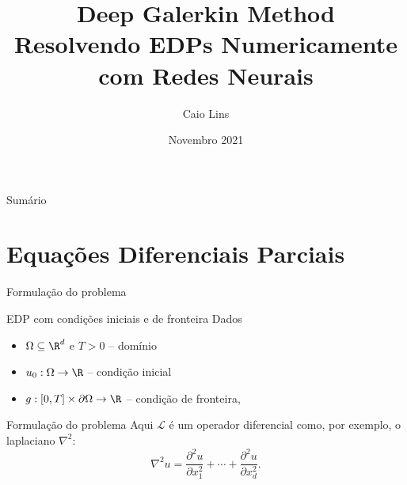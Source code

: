 \documentclass[13pt]{beamer}
\title[Deep Galerkin Method]{Deep Galerkin Method \\ {\normalsize Resolvendo EDPs Numericamente com Redes Neurais}}
\author[C. Lins]{Caio Lins}
\institute[EMAp]{FGV - EMAp}
\date[EMAp 2021]{Novembro 2021}
\begin{document}
\maketitle

\begin{frame}{Sumário}
    \tableofcontents
\end{frame}


\section{Equações Diferenciais Parciais}

\begin{frame}{Formulação do problema}
    \begin{block}{EDP com condições iniciais e de fronteira}
        Dados
        \begin{itemize}
            \item \( \Omega \subseteq \R^{ d } \) e \( T > 0 \) -- domínio
            \item \( u_{ 0 } : \Omega \to \R \) -- condição inicial
            \item \( g : [0, T] \times \partial \Omega \to \R \) -- condição de fronteira,
        \end{itemize}
    \end{block}

\end{frame}

\begin{frame}{Formulação do problema}
    Aqui \( \mathcal{L} \) é um operador diferencial como, por exemplo, o laplaciano \( \nabla^2 \):
    \begin{equation*}
        \nabla^2 u = \frac{ \partial^2 u }{ \partial x_{ 1 }^2 } + \cdots + \frac{ \partial^2 u }{ \partial x_{ d }^2 }
    .\end{equation*}
\end{frame}
\end{document}
